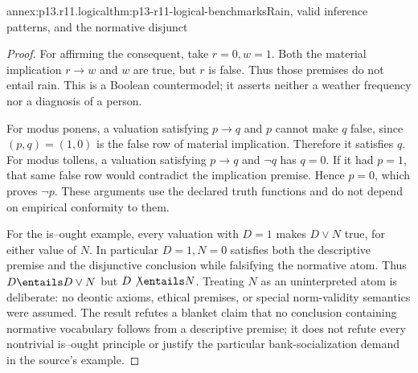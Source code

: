 \begin{annexitem}{annex:p13.r11.logical}{thm:p13-r11-logical-benchmarks}{Rain, valid inference patterns, and the normative disjunct}
\begin{proof}
For affirming the consequent, take \(r=0,w=1\). Both the material
implication \(r\to w\) and \(w\) are true, but \(r\) is false.
Thus those premises do not entail rain. This is a Boolean countermodel;
it asserts neither a weather frequency nor a diagnosis of a person.

For modus ponens, a valuation satisfying \(p\to q\) and \(p\)
cannot make \(q\) false, since \((p,q)=(1,0)\) is the false row
of material implication. Therefore it satisfies \(q\).
For modus tollens, a valuation satisfying \(p\to q\) and
\(\neg q\) has \(q=0\). If it had \(p=1\), that same false
row would contradict the implication premise. Hence \(p=0\),
which proves \(\neg p\). These arguments use the declared
truth functions and do not depend on empirical conformity to them.

For the is--ought example, every valuation with \(D=1\) makes
\(D\lor N\) true, for either value of \(N\). In particular
\(D=1,N=0\) satisfies both the descriptive premise and the
disjunctive conclusion while falsifying the normative atom. Thus
\(D\entails D\lor N\) but \(D\not\entails N\).
Treating \(N\) as an uninterpreted atom is deliberate: no deontic
axioms, ethical premises, or special norm-validity semantics were
assumed. The result refutes a blanket claim that no conclusion
containing normative vocabulary follows from a descriptive premise;
it does not refute every nontrivial is--ought principle or justify
the particular bank-socialization demand in the source's example.
\end{proof}
\end{annexitem}
